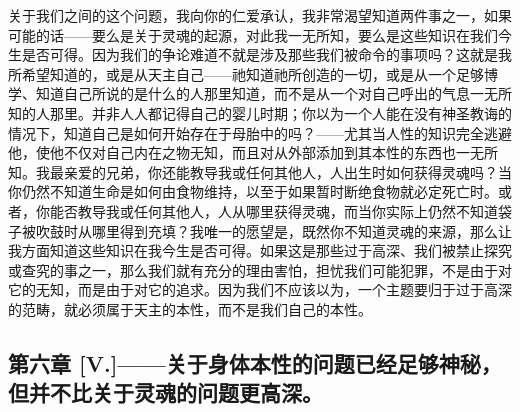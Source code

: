 关于我们之间的这个问题，我向你的仁爱承认，我非常渴望知道两件事之一，如果可能的话——要么是关于灵魂的起源，对此我一无所知，要么是这些知识在我们今生是否可得。因为我们的争论难道不就是涉及那些我们被命令的事项吗？这就是我所希望知道的，或是从天主自己——祂知道祂所创造的一切，或是从一个足够博学、知道自己所说的是什么的人那里知道，而不是从一个对自己呼出的气息一无所知的人那里。并非人人都记得自己的婴儿时期；你以为一个人能在没有神圣教诲的情况下，知道自己是如何开始存在于母胎中的吗？——尤其当人性的知识完全逃避他，使他不仅对自己内在之物无知，而且对从外部添加到其本性的东西也一无所知。我最亲爱的兄弟，你还能教导我或任何其他人，人出生时如何获得灵魂吗？当你仍然不知道生命是如何由食物维持，以至于如果暂时断绝食物就必定死亡时。或者，你能否教导我或任何其他人，人从哪里获得灵魂，而当你实际上仍然不知道袋子被吹鼓时从哪里得到充填？我唯一的愿望是，既然你不知道灵魂的来源，那么让我方面知道这些知识在我今生是否可得。如果这是那些过于高深、我们被禁止探究或查究的事之一，那么我们就有充分的理由害怕，担忧我们可能犯罪，不是由于对它的无知，而是由于对它的追求。因为我们不应该以为，一个主题要归于过于高深的范畴，就必须属于天主的本性，而不是我们自己的本性。\par


\subsection{第六章 [V.]——关于身体本性的问题已经足够神秘，但并不比关于灵魂的问题更高深。}

